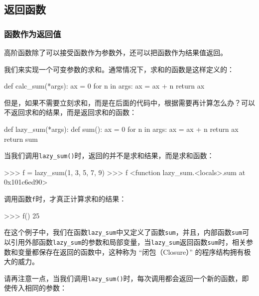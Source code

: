 \hypertarget{ux8fd4ux56deux51fdux6570}{%
\subsection{返回函数}\label{ux8fd4ux56deux51fdux6570}}

\hypertarget{ux51fdux6570ux4f5cux4e3aux8fd4ux56deux503c}{%
\subsubsection{函数作为返回值}\label{ux51fdux6570ux4f5cux4e3aux8fd4ux56deux503c}}

高阶函数除了可以接受函数作为参数外，还可以把函数作为结果值返回。

我们来实现一个可变参数的求和。通常情况下，求和的函数是这样定义的：

\begin{pythoncode}
def calc_sum(*args):
    ax = 0
    for n in args:
        ax = ax + n
    return ax
\end{pythoncode}

但是，如果不需要立刻求和，而是在后面的代码中，根据需要再计算怎么办？可以不返回求和的结果，而是返回求和的函数：

\begin{pythoncode}
def lazy_sum(*args):
    def sum():
        ax = 0
        for n in args:
            ax = ax + n
        return ax
    return sum
\end{pythoncode}

当我们调用\texttt{lazy\_sum()}时，返回的并不是求和结果，而是求和函数：

\begin{pythoncode}
>>> f = lazy_sum(1, 3, 5, 7, 9)
>>> f
<function lazy_sum.<locals>.sum at 0x101c6ed90>
\end{pythoncode}

调用函数\texttt{f}时，才真正计算求和的结果：

\begin{pythoncode}
>>> f()
25
\end{pythoncode}

在这个例子中，我们在函数\texttt{lazy\_sum}中又定义了函数\texttt{sum}，并且，内部函数\texttt{sum}可以引用外部函数\texttt{lazy\_sum}的参数和局部变量，当\texttt{lazy\_sum}返回函数\texttt{sum}时，相关参数和变量都保存在返回的函数中，这种称为
``闭包（Closure）'' 的程序结构拥有极大的威力。

请再注意一点，当我们调用\texttt{lazy\_sum()}时，每次调用都会返回一个新的函数，即使传入相同的参数：

